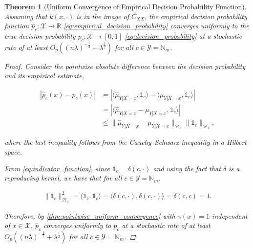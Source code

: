 \documentclass{article}
\newtheorem{theorem}{Theorem}[section]
\begin{document}
	\begin{theorem}[Uniform Convergence of Empirical Decision Probability Function]
		\label{thm:probability_convergence}
		Assuming that $k(x, \cdot)$ is in the image of $C_{XX}$, the empirical decision probability function $\hat{p}_{c} : \mathcal{X} \to \mathbb{R}$ \eqref{eq:empirical_decision_probability} converges uniformly to the true decision probability $p_{c} : \mathcal{X} \to [0, 1]$ \eqref{eq:decision_probability} at a stochastic rate of at least $O_{p}((n \lambda)^{-\frac{1}{2}} + \lambda^{\frac{1}{2}})$ for all $c \in \mathcal{Y} = \mathbb{N}_{m}$.
		
		\begin{proof}
			Consider the pointwise absolute difference between the decision probability and its empirical estimate,
			
			\begin{equation}
			\begin{aligned}
				| \hat{p}_{c}(x) - p_{c}(x) | &= | \langle \hat{\mu}_{Y | X = x}, \mathbb{1}_{c} \rangle - \langle \mu_{Y | X = x}, \mathbb{1}_{c} \rangle | \\
				&= | \langle \hat{\mu}_{Y | X = x} - \mu_{Y | X = x}, \mathbb{1}_{c} \rangle | \\
				&\leq \big\| \hat{\mu}_{Y | X = x} - \mu_{Y | X = x} \big\|_{\mathcal{H}_{\delta}} \big\| \mathbb{1}_{c} \big\|_{\mathcal{H}_{\delta}},
			\label{eq:decision_probability_error_upper_bound}
			\end{aligned}
			\end{equation}
			
			where the last inequality follows from the Cauchy–Schwarz inequality in a Hilbert space.
			
			From \eqref{eq:indicator_function}, since $\mathbb{1}_{c} = \delta(c, \cdot)$ and using the fact that $\delta$ is a reproducing kernel, we have that for all $c \in \mathcal{Y} = \mathbb{N}_{m}$.
			
			\begin{equation}
			\begin{aligned}
				\big\| \mathbb{1}_{c} \big\|_{\mathcal{H}_{\delta}}^{2} = \langle \mathbb{1}_{c}, \mathbb{1}_{c} \rangle = \langle \delta(c, \cdot), \delta(c, \cdot) \rangle = \delta(c, c) = 1.
			\label{eq:indicator_rkhs_norm}
			\end{aligned}
			\end{equation}
			
			Therefore, by \cref{thm:pointwise_uniform_convergence} with $\gamma(x) = 1$ independent of $x \in \mathcal{X}$, $\hat{p}_{c}$ converges uniformly to $p_{c}$ at a stochastic rate of at least $O_{p}((n \lambda)^{-\frac{1}{2}} + \lambda^{\frac{1}{2}})$ for all $c \in \mathcal{Y} = \mathbb{N}_{m}$.
			

\end{proof}
\end{theorem}
\end{document}
